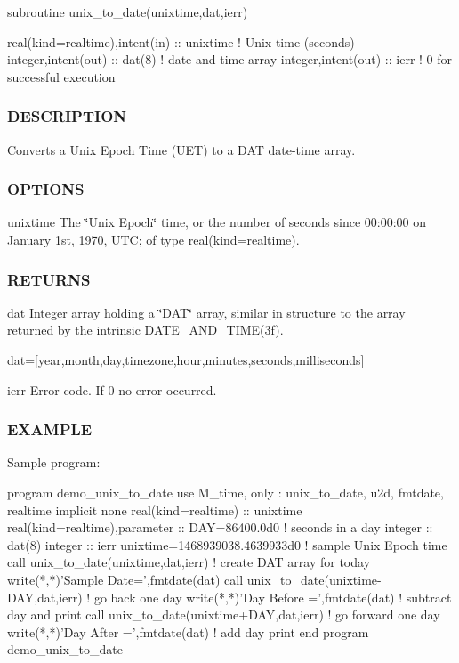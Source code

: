 \begin{DoxyVerb}
\begin{DoxyVerb}subroutine unix_to_date(unixtime,dat,ierr)

 real(kind=realtime),intent(in) :: unixtime ! Unix time (seconds)
 integer,intent(out)            :: dat(8)   ! date and time array
 integer,intent(out)            :: ierr     ! 0 for successful execution
\end{DoxyVerb}


\subsubsection*{D\+E\+S\+C\+R\+I\+P\+T\+I\+ON}

Converts a Unix Epoch Time (U\+ET) to a D\+AT date-\/time array.

\subsubsection*{O\+P\+T\+I\+O\+NS}

unixtime The \char`\"{}\+Unix Epoch\char`\"{} time, or the number of seconds since 00\+:00\+:00 on January 1st, 1970, U\+TC; of type real(kind=realtime).

\subsubsection*{R\+E\+T\+U\+R\+NS}

dat Integer array holding a \char`\"{}\+D\+A\+T\char`\"{} array, similar in structure to the array returned by the intrinsic D\+A\+T\+E\+\_\+\+A\+N\+D\+\_\+\+T\+I\+M\+E(3f).

dat=\mbox{[}year,month,day,timezone,hour,minutes,seconds,milliseconds\mbox{]}

ierr Error code. If 0 no error occurred.

\subsubsection*{E\+X\+A\+M\+P\+LE}

\begin{DoxyVerb}Sample program:

 program demo_unix_to_date
 use M_time, only : unix_to_date, u2d, fmtdate, realtime
 implicit none
 real(kind=realtime)           :: unixtime
 real(kind=realtime),parameter :: DAY=86400.0d0 ! seconds in a day
 integer                       :: dat(8)
 integer                       :: ierr
    unixtime=1468939038.4639933d0            ! sample Unix Epoch time
    call unix_to_date(unixtime,dat,ierr)     ! create DAT array for today
    write(*,*)'Sample Date=',fmtdate(dat)
    call unix_to_date(unixtime-DAY,dat,ierr) ! go back one day
    write(*,*)'Day Before =',fmtdate(dat)    ! subtract day and print
    call unix_to_date(unixtime+DAY,dat,ierr) ! go forward one day
    write(*,*)'Day After  =',fmtdate(dat)    ! add day print
 end program demo_unix_to_date


\end{DoxyVerb}
\end{DoxyVerb}
